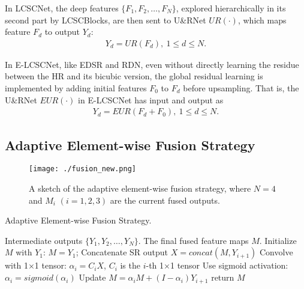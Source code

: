 \documentclass[journal]{IEEEtran}
\begin{document}
In LCSCNet, the deep features $\{F_{1},F_{2},\dots,F_{N}\}$, explored hierarchically in its second part by LCSCBlocks, are then sent to U\&RNet $UR(\cdot)$, which maps feature $F_{d}$ to output $Y_{d}$:
\begin{equation}
\begin{split}
Y_{d}=UR(F_{d}),~1\leq d \leq N.
\end{split}
\label{con:over_3}
\end{equation}

In E-LCSCNet, like EDSR and RDN, even without directly learning the residue between the HR and its bicubic version, the global residual learning is implemented by adding initial features $F_{0}$ to $F_{d}$ before upsampling. That is, the U\&RNet $EUR(\cdot)$ in E-LCSCNet has input and output as
\begin{equation}
    \begin{split}
        Y_{d}=EUR(F_{d}+F_{0}),~1\leq d \leq N.
    \end{split}
    \label{con:eur}
\end{equation}

\subsection{Adaptive Element-wise Fusion Strategy}

\begin{figure*}[htbp]
\centering
\texttt{[image: ./fusion\_new.png]}
\caption{\small A sketch of the adaptive element-wise fusion strategy, where $N=4$ and $M_{i}$ $(i=1,2,3)$ are the current fused outputs.}
\label{fig:F5}
\end{figure*}

\begin{algorithm}[ht]  
  \caption{Adaptive Element-wise Fusion Strategy.}  
  \begin{algorithmic}[1]
    \Require   
      Intermediate outputs $\{Y_{1},Y_{2},\dots,Y_{N} \}$.
    \Ensure  
      The final fused feature maps $M$. 
    \State Initialize $M$ with $Y_{1}$: $M=Y_{1}$;   
      \State Concatenate SR output $X=concat(M, Y_{i+1})$
      \State Convolve with 1$\times$1 tensor: $\alpha_{i} = C_{i}X$, $C_{i}$ is the $i$-th 1$\times$1 tensor
      \State Use sigmoid activation: $\alpha_{i} = sigmoid(\alpha_{i})$
      \State Update $M=\alpha_{i}M+(I-\alpha_{i})Y_{i+1}$
    \EndFor 
    \State return $M$ 
  \end{algorithmic}\label{alg1}  
\end{algorithm} 
\end{document}
